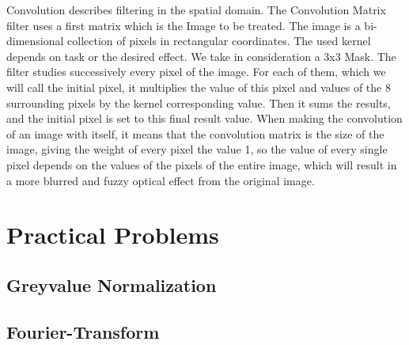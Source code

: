 \documentclass[a4paper,twocolumn]{article}
\begin{document}
	Convolution describes filtering in the spatial domain. The Convolution Matrix  filter uses a  first matrix which is the Image to be treated. The image is a bi-dimensional collection of pixels in rectangular coordinates. The used kernel depends on task or the desired effect. We take in consideration a 3x3 Mask. The  filter studies successively every pixel of the image. For each of them, which we will call the  initial pixel, it multiplies the value of this pixel and values of the 8 surrounding pixels by the kernel corresponding value. Then it sums the results, and the initial pixel is set to this  final result value. When making the convolution of an image with itself, it means that the convolution matrix is the size of the image, giving the weight of every pixel the value 1, so the value of every single pixel depends on the values of the pixels of the entire image, which will result in a more blurred and fuzzy optical effect from the original image.
	
	\section{Practical Problems}
	
	\subsection{Greyvalue Normalization}
	
	\subsection{Fourier-Transform}
	
\end{document}
